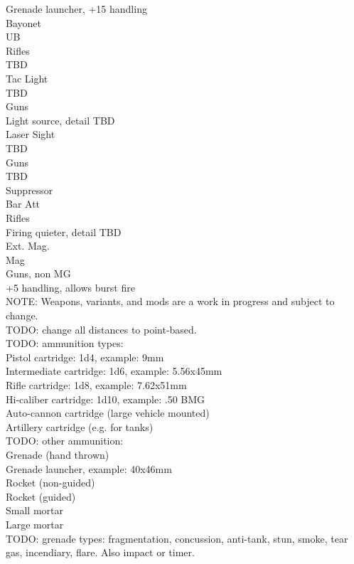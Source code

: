 \documentclass[letterpaper,titlepage,openany,twocolumn]{book}
\begin{document}
Grenade launcher, +15 handling\\
Bayonet\\
UB\\
Rifles\\
TBD\\
Tac Light\\
TBD\\
Guns\\
Light source, detail TBD\\
Laser Sight\\
TBD\\
Guns\\
TBD\\
Suppressor\\
Bar Att\\
Rifles\\
Firing quieter, detail TBD\\
Ext. Mag.\\
Mag\\
Guns, non MG\\
+5 handling, allows burst fire\\

NOTE: Weapons, variants, and mods are a work in progress and subject to change.\\

TODO: change all distances to point-based.\\

TODO: ammunition types:\\
	Pistol cartridge: 1d4, example: 9mm\\
	Intermediate cartridge: 1d6, example: 5.56x45mm\\
	Rifle cartridge: 1d8, example: 7.62x51mm\\
	Hi-caliber cartridge: 1d10, example: .50 BMG\\
	Auto-cannon cartridge (large vehicle mounted)\\
	Artillery cartridge (e.g. for tanks)\\

TODO: other ammunition:\\
	Grenade (hand thrown)\\
	Grenade launcher, example: 40x46mm\\
	Rocket (non-guided)\\
	Rocket (guided)\\
	Small mortar\\
	Large mortar\\
TODO: grenade types: fragmentation, concussion, anti-tank, stun, smoke, tear gas, incendiary, flare. Also impact or timer.\\
\end{document}
